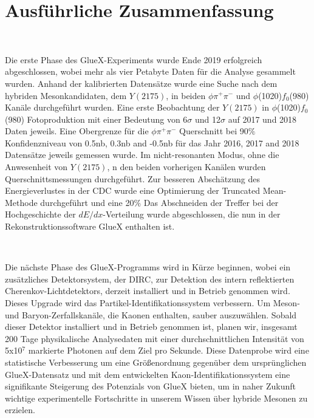 \section{Ausf\"uhrliche Zusammenfassung}
\label{p.6}

~\par Die erste Phase des GlueX-Experiments wurde Ende 2019 erfolgreich abgeschlossen, wobei mehr als vier Petabyte Daten f\"ur die Analyse gesammelt wurden. Anhand der kalibrierten Datens\"atze wurde eine Suche nach dem hybriden Mesonkandidaten, dem $Y(2175)$, in beiden $\phi\pi^{+}\pi^{-}$ und $\phi$(1020)$f_0$(980) Kan\"ale durchgef\"uhrt wurden. Eine erste Beobachtung der $Y(2175)$ in $\phi$(1020)$f_0$(980) Fotoproduktion mit einer Bedeutung von 6$\sigma$ und 12$\sigma$ auf 2017 und 2018 Daten jeweils. Eine Obergrenze f\"ur die $\phi\pi^{+}\pi^{-}$ Querschnitt bei 90$\%$ Konfidenzniveau von 0.5nb, 0.3nb and -0.5nb f\"ur das Jahr 2016, 2017 and 2018 Datens\"atze jeweils gemessen wurde. Im nicht-resonanten Modus, ohne die Anwesenheit von $Y(2175)$, n den beiden vorherigen Kan\"alen wurden Querschnittsmessungen durchgef\"uhrt. Zur besseren Absch\"atzung des Energieverlustes in der CDC wurde eine Optimierung der Truncated Mean-Methode durchgef\"uhrt und eine 20$\%$ Das Abschneiden der Treffer bei der Hochgeschichte der $dE/dx$-Verteilung wurde abgeschlossen, die nun in der Rekonstruktionssoftware GlueX enthalten ist.

~\par Die n\"achste Phase des GlueX-Programms wird in K\"urze beginnen, wobei ein zus\"atzliches Detektorsystem, der DIRC, zur Detektion des intern reflektierten Cherenkov-Lichtdetektors, derzeit installiert und in Betrieb genommen wird. Dieses Upgrade wird das Partikel-Identifikationssystem verbessern. Um Meson- und Baryon-Zerfallskan\"ale, die Kaonen enthalten, sauber auszuw\"ahlen. Sobald dieser Detektor installiert und in Betrieb genommen ist, planen wir, insgesamt 200 Tage physikalische Analysedaten mit einer durchschnittlichen Intensit\"at von 5x10$^7$ markierte Photonen auf dem Ziel pro Sekunde. Diese Datenprobe wird eine statistische Verbesserung um eine Gr\"o{\ss}enordnung gegen\"uber dem urspr\"unglichen GlueX-Datensatz und mit dem entwickelten Kaon-Identifikationssystem eine signifikante Steigerung des Potenzials von GlueX bieten, um in naher Zukunft wichtige experimentelle Fortschritte in unserem Wissen \"uber hybride Mesonen zu erzielen.